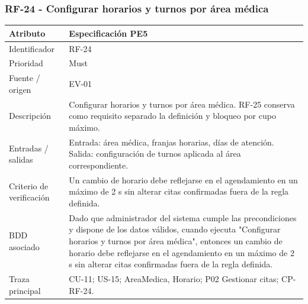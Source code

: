 \documentclass[11pt,a4paper]{article}
\begin{document}
	\subsubsection{RF-24 - Configurar horarios y turnos por área médica}
	\begin{tabularx}{\textwidth}{p{3.2cm}Y}
		\toprule
		\textbf{Atributo} & \textbf{Especificación PE5}\\\midrule
		Identificador & RF-24\\
		Prioridad & Must\\
		Fuente / origen & EV-01\\
		Descripción & Configurar horarios y turnos por área médica. RF-25 conserva como requisito separado la definición y bloqueo por cupo máximo.\\
		Entradas / salidas & Entrada: área médica, franjas horarias, días de atención. Salida: configuración de turnos aplicada al área correspondiente.\\
		Criterio de verificación & Un cambio de horario debe reflejarse en el agendamiento en un máximo de 2 s sin alterar citas confirmadas fuera de la regla definida.\\
		BDD asociado & Dado que administrador del sistema cumple las precondiciones y dispone de los datos válidos, cuando ejecuta "Configurar horarios y turnos por área médica", entonces un cambio de horario debe reflejarse en el agendamiento en un máximo de 2 s sin alterar citas confirmadas fuera de la regla definida.\\
		Traza principal & CU-11; US-15; AreaMedica, Horario; P02 Gestionar citas; CP-RF-24.\\
		\bottomrule
	\end{tabularx}
	\clearpage
\end{document}
